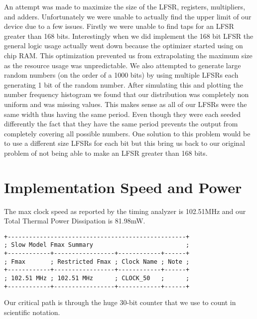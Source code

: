 \documentclass[12pt]{article}
\begin{document}
An attempt was made to maximize the size of the LFSR, registers, multipliers, and adders. Unfortunately we were unable to actually find the upper limit of our device due to a few issues. Firstly we were unable to find taps for an LFSR greater than 168 bits. Interestingly when we did implement the 168 bit LFSR the general logic usage actually went down because the optimizer started using on chip RAM. This optimization prevented us from extrapolating the maximum size as the resource usage was unpredictable. We also attempted to generate large random numbers (on the order of a 1000 bits) by using multiple LFSRs each generating 1 bit of the random number. After simulating this and plotting the number frequency histogram we found that our distribution was completely non uniform and was missing values. This makes sense as all of our LFSRs were the same width thus having the same period. Even though they were each seeded differently the fact that they have the same period prevents the output from completely covering all possible numbers. One solution to this problem would be to use a different size LFSRs for each bit but this bring us back to our original problem of not being able to make an LFSR greater than 168 bits. 


\section*{Implementation Speed and Power}


The max clock speed as reported by the timing analyzer is 102.51MHz and our Total Thermal Power Dissipation is 81.98mW.


\begin{verbatim}
+--------------------------------------------------+
; Slow Model Fmax Summary                          ;
+------------+-----------------+------------+------+
; Fmax       ; Restricted Fmax ; Clock Name ; Note ;
+------------+-----------------+------------+------+
; 102.51 MHz ; 102.51 MHz      ; CLOCK_50   ;      ;
+------------+-----------------+------------+------+
\end{verbatim}


Our critical path is through the huge 30-bit counter that we use to count in scientific notation. 
\end{document}
